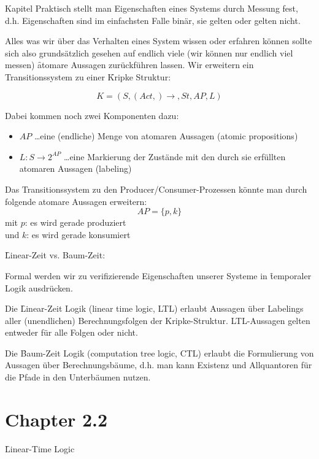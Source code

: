\begin{chapter}{Kapitel}
\noindent Praktisch stellt man Eigenschaften eines Systems durch Messung fest, d.h. Eigenschaften sind im einfachsten Falle binär, sie gelten oder gelten nicht.
\vspace*{4pt}

\noindent Alles was wir über das Verhalten eines System wissen oder erfahren können sollte sich also grundsätzlich gesehen auf endlich viele (wir können nur endlich viel 
messen) \f{atomare Aussagen} zurückführen lassen. Wir erweitern ein Transitionssystem zu einer \f{Kripke Struktur}: 

\[K = (S,(Act,)\rightarrow, St, AP, L)\]

\noindent Dabei kommen noch zwei Komponenten dazu: 
\begin{itemize}
 \item $AP$ \dots eine (endliche) Menge von atomaren Aussagen (atomic propositions)
 \item $L:S \rightarrow 2^{AP}$ \dots eine Markierung der Zustände mit den durch sie erfüllten atomaren Aussagen (labeling) 
\end{itemize}

\newpage 
\noindent Das Transitionssystem zu den Producer/Consumer-Prozessen könnte man durch folgende atomare Aussagen erweitern: \[AP=\{p,k\}\] mit $p$: es wird gerade produziert 
\\ und $k$: es wird gerade konsumiert
\vspace*{5pt}

\f{Linear-Zeit vs. Baum-Zeit}:
\vspace*{5pt}

\noindent Formal werden wir zu verifizierende Eigenschaften unserer Systeme in \f{temporaler Logik} ausdrücken. 
\vspace*{4pt}

\noindent Die \f{Linear-Zeit Logik (linear time logic, LTL)} erlaubt Aussagen über Labelings aller (unendlichen) Berechnungsfolgen der Kripke-Struktur. 
LTL-Aussagen gelten entweder für alle Folgen oder nicht. 
\vspace*{4pt}

\noindent Die \f{Baum-Zeit Logik (computation tree logic, CTL)} erlaubt die Formulierung von Aussagen über Berechnungsbäume, d.h. man kann Existenz und 
Allquantoren für die Pfade in den Unterbäumen nutzen.

\section*{Chapter 2.2}
\f{Linear-Time Logic} 
\vspace*{3pt}


\end{chapter}

